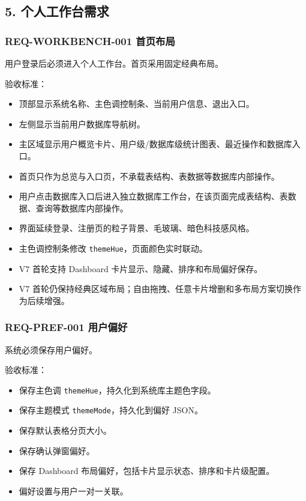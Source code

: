 \documentclass[
  a4paper,
  UTF8]{ctexart}
\providecommand{\tightlist}{%
  \setlength{\itemsep}{0pt}\setlength{\parskip}{0pt}}
\begin{document}
\hypertarget{ux4e2aux4ebaux5de5ux4f5cux53f0ux9700ux6c42}{%
\subsection{5.
个人工作台需求}\label{ux4e2aux4ebaux5de5ux4f5cux53f0ux9700ux6c42}}

\hypertarget{req-workbench-001-ux9996ux9875ux5e03ux5c40}{%
\subsubsection{REQ-WORKBENCH-001
首页布局}\label{req-workbench-001-ux9996ux9875ux5e03ux5c40}}

用户登录后必须进入个人工作台。首页采用固定经典布局。

验收标准：

\begin{itemize}
\tightlist
\item
  顶部显示系统名称、主色调控制条、当前用户信息、退出入口。
\item
  左侧显示当前用户数据库导航树。
\item
  主区域显示用户概览卡片、用户级/数据库级统计图表、最近操作和数据库入口。
\item
  首页只作为总览与入口页，不承载表结构、表数据等数据库内部操作。
\item
  用户点击数据库入口后进入独立数据库工作台，在该页面完成表结构、表数据、查询等数据库内部操作。
\item
  界面延续登录、注册页的粒子背景、毛玻璃、暗色科技感风格。
\item
  主色调控制条修改 \texttt{themeHue}，页面颜色实时联动。
\item
  V7 首轮支持 Dashboard 卡片显示、隐藏、排序和布局偏好保存。
\item
  V7
  首轮仍保持经典区域布局；自由拖拽、任意卡片增删和多布局方案切换作为后续增强。
\end{itemize}

\hypertarget{req-pref-001-ux7528ux6237ux504fux597d}{%
\subsubsection{REQ-PREF-001
用户偏好}\label{req-pref-001-ux7528ux6237ux504fux597d}}

系统必须保存用户偏好。

验收标准：

\begin{itemize}
\tightlist
\item
  保存主色调 \texttt{themeHue}，持久化到系统库主题色字段。
\item
  保存主题模式 \texttt{themeMode}，持久化到偏好 JSON。
\item
  保存默认表格分页大小。
\item
  保存确认弹窗偏好。
\item
  保存 Dashboard 布局偏好，包括卡片显示状态、排序和卡片级配置。
\item
  偏好设置与用户一对一关联。
\end{itemize}
\end{document}
